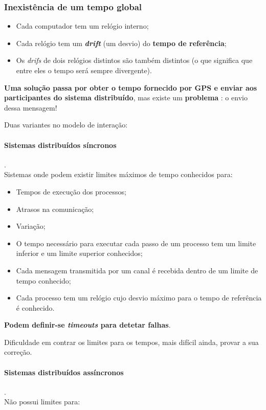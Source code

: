 \documentclass{article}
\begin{document}
\subsubsection{Inexistência de um tempo global}

\begin{itemize}
	\item Cada computador tem um relógio interno;
	\item Cada relógio tem um \textbf{\textit{drift}} (um desvio) do \textbf{tempo de referência};
	\item Os \textit{drifs} de dois relógios distintos são também distintos (o que significa que entre eles o tempo será sempre divergente).
\end{itemize}

\textbf{Uma solução passa por obter o tempo fornecido por GPS e enviar aos participantes do sistema distribuído}, mas existe um \textbf{problema} : o envio dessa mensagem!

Duas variantes no modelo de interação:

\paragraph{Sistemas distribuídos \textbf{síncronos}}. \\ 

Sistemas onde podem existir limites máximos de tempo conhecidos para:

\begin{itemize}
	\item Tempos de execução dos processos; 
	\item Atrasos na comunicação;
	\item Variação;
	\item O tempo necessário para executar cada passo de um processo tem um limite inferior e um limite superior conhecidos;
	\item Cada mensagem transmitida por um canal é recebida dentro de um limite de tempo conhecido;
	\item Cada processo tem um relógio cujo desvio máximo para o tempo de referência é conhecido.
\end{itemize}

\textbf{Podem definir-se \textit{timeouts} para detetar falhas}.

Dificuldade em contrar os limites para os tempos, mais difícil ainda, provar a sua correção.

\paragraph{Sistemas distribuídos \textbf{assíncronos}}. \\ Não possui limites para:
\end{document}

